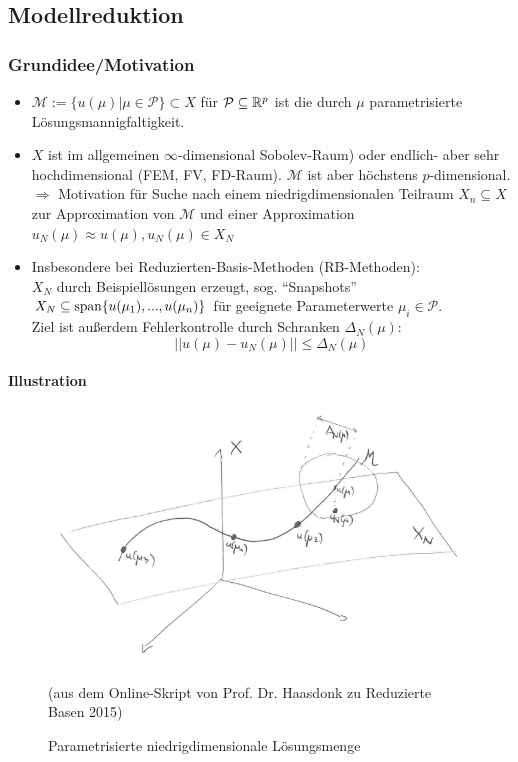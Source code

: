 \subsection{Modellreduktion}
\label{Modellreduktion}

\subsubsection*{Grundidee/Motivation}
\label{Grundidee/Motivation}

\begin{itemize}
	\item $\mathcal{M}:= \{u(\mu) | \mu \in \mathcal{P}\} \subset X$ für $\mathcal{P} \subseteq \mathbb{R}^p$ ist die durch $\mu$ parametrisierte Lösungsmannigfaltigkeit.
	\item $X$ ist im allgemeinen $\infty$-dimensional Sobolev-Raum) oder endlich- aber  sehr hochdimensional (FEM, FV, FD-Raum). $\mathcal{M}$ ist aber höchstens $p$-dimensional. \\
	$\Rightarrow$ Motivation für Suche nach einem niedrigdimensionalen Teilraum $X_n \subseteq X$ zur Approximation von $\mathcal{M}$ und einer Approximation $u_N(\mu) \approx u(\mu), u_N(\mu) \in X_N$
	\item Insbesondere bei Reduzierten-Basis-Methoden (RB-Methoden): \\
	$X_N$ durch Beispiellösungen erzeugt, sog. "`Snapshots"' \\
	$X_N \subseteq \operatorname{span}\{u(\mu_1),...,u(\mu_n)\}$ für geeignete Parameterwerte $\mu_i \in \mathcal{P}$. \\
	Ziel ist außerdem Fehlerkontrolle durch Schranken $\Delta_N(\mu)$: \\
	\[
	||u(\mu) - u_N(\mu)|| \le \Delta_N(\mu)
	\]
\end{itemize}

\paragraph*{Illustration}

\begin{figure}[H]
  \centering\small
    \includegraphics[width = 0.7 \textwidth]{Bilder/IllustrationM.png}
  \caption{Parametrisierte niedrigdimensionale Lösungsmenge}{(aus dem Online-Skript von Prof. Dr. Haasdonk zu Reduzierte Basen 2015)}
  \label{fig:IllustrationM}
\end{figure}

